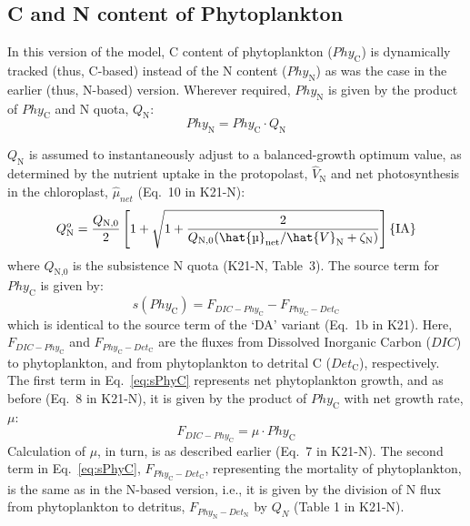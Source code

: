 \documentclass[gmd, manuscript]{copernicus}
\begin{document}
\subsection{C and N content of Phytoplankton}
In this version of the model, C content of phytoplankton ($Phy_\text{C}$) is dynamically tracked (thus, C-based) instead of the N content ($Phy_\text{N}$) as was the case in the earlier (thus, N-based) version. Wherever required, $Phy_\text{N}$ is given by the product of $Phy_\text{C}$ and N quota, $Q_\text{N}$:
\begin{equation} \label{eq:Q}
Phy_\text{N} = Phy_\text{C} \cdot Q_\text{N}  
\end{equation}

$Q_\text{N}$ is assumed to instantaneously adjust to a balanced-growth optimum value, as determined by the nutrient uptake in the protopolast, $\hat{V}_\text{N}$ and net photosynthesis in the chloroplast, $\hat{\mu}_{net}$ (Eq.~10 in K21-N):
\begin{equation}\label{eq:Qopt}
 Q_\text{N}^o= \frac{Q_\text{N,0}}{2} \left[1+\sqrt{1+\frac{2}{Q_\text{N,0}{({\hat{\mu}_{\text{net}}}/{\hat{V}_\text{N}}+\zeta_{\text{N}} )}}} \right] \hfill \{\text{IA}\}
\end{equation}
where $Q_\text{N,0}$ is the subsistence N quota (K21-N, Table~3). The source term for $Phy_\text{C}$ is given by:
\begin{equation} \label{eq:sPhyC}
s(Phy_{\text{C}}) = F_{DIC-Phy_\text{C}} - F_{Phy_{\text{C}}-Det_{\text{C}}}
\end{equation}
which is identical to the source term of the `DA' variant (Eq.~1b in K21). Here, $F_{DIC-Phy_\text{C}}$ and $F_{Phy_{\text{C}}-Det_{\text{C}}}$ are the fluxes from Dissolved Inorganic Carbon ($DIC$) to phytoplankton, and from phytoplankton to detrital C ($Det_\text{C}$), respectively. The first term in Eq.~\ref{eq:sPhyC} represents net phytoplankton growth, and as before (Eq.~8 in K21-N), it is given by the product of $Phy_\text{C}$ with net growth rate, $\mu$: 
\begin{equation} \label{eq:fdicphyc}
 F_{DIC-Phy_\text{C}} = \mu \cdot Phy_\text{C}
\end{equation}
Calculation of $\mu$, in turn, is as described earlier (Eq.~7 in K21-N). The second term in Eq.~\ref{eq:sPhyC}, $F_{Phy_\text{C}-Det_\text{C}}$, representing the mortality of phytoplankton, is the same as in the N-based version, i.e., it is given by the division of N flux from phytoplankton to detritus, $F_{Phy_\text{N}-Det_\text{N}}$ by $Q_N$ (Table 1 in K21-N).
\end{document}

